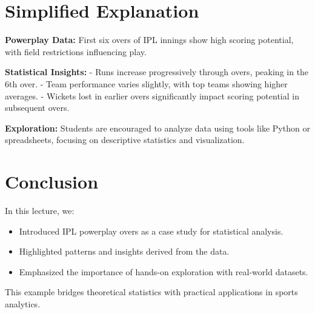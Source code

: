 \documentclass{article}
\begin{document}
\section*{Simplified Explanation}

\textbf{Powerplay Data:}
First six overs of IPL innings show high scoring potential, with field restrictions influencing play.

\textbf{Statistical Insights:}
- Runs increase progressively through overs, peaking in the 6th over.
- Team performance varies slightly, with top teams showing higher averages.
- Wickets lost in earlier overs significantly impact scoring potential in subsequent overs.

\textbf{Exploration:}
Students are encouraged to analyze data using tools like Python or spreadsheets, focusing on descriptive statistics and visualization.

\section*{Conclusion}

In this lecture, we:
\begin{itemize}
  \item Introduced IPL powerplay overs as a case study for statistical analysis.
  \item Highlighted patterns and insights derived from the data.
  \item Emphasized the importance of hands-on exploration with real-world datasets.
\end{itemize}

This example bridges theoretical statistics with practical applications in sports analytics.
\end{document}
